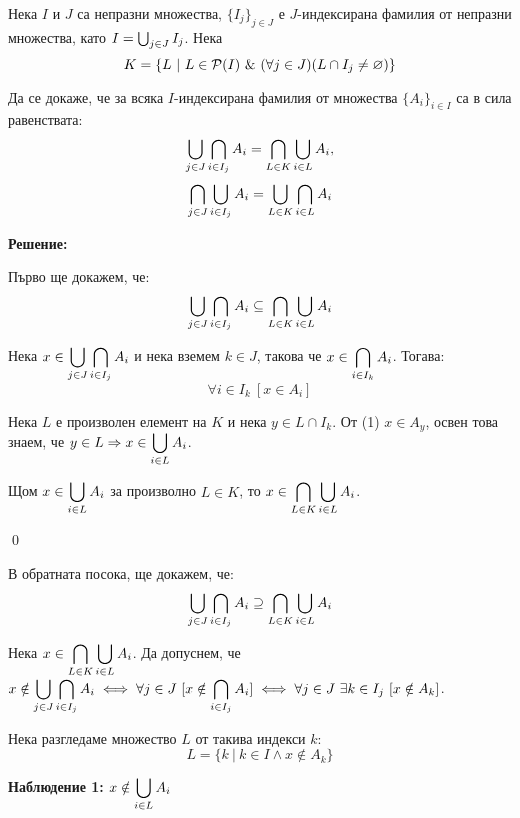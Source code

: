 \begin{problem}
Нека $I$ и $J$ са непразни множества, $\{I_j\}_{j \in J}$ е $J$-индексирана фамилия от непразни множества,
като $I = \bigcup_{j \in J} I_j$. Нека
\[
K = \{L\ |\ L \in \pow(I) \land (\forall j \in J) (L \cap I_j \neq \varnothing)\}
\]

Да се докаже, че за всяка $I$-индексирана фамилия от множества $\{A_i\}_{i \in I}$ са в сила равенствата:
\[
\bigcup_{j \in J} \bigcap_{i \in I_j} A_i = \bigcap_{L \in K} \bigcup_{i \in L} A_i,
\]
\[
\bigcap_{j \in J} \bigcup_{i \in I_j} A_i = \bigcup_{L \in K} \bigcap_{i \in L} A_i
\]

\textbf{Решение:}
\smallbreak

\quad
Първо ще докажем, че:
\[
\bigcup_{j \in J} \bigcap_{i \in I_j} A_i \subseteq \bigcap_{L \in K} \bigcup_{i \in L} A_i
\]

\begin{tcolorbox}[mybox={Доказателство:}]
Нека \(\displaystyle x \in \bigcup_{j \in J} \bigcap_{i \in I_j} A_i\) и нека
вземем $k \in J$, такова че $\displaystyle x \in \bigcap_{i \in I_k} A_i$. Тогава:
\begin{equation}
\forall i \in I_k\ [x \in A_i]
\end{equation}


Нека $L$ е произволен елемент на $K$ и нека $y \in L \cap I_k$.
От (1) $x \in A_y$, освен това знаем, че $\displaystyle y \in L \Rightarrow x \in \bigcup_{i \in L} A_i$.

Щом $\displaystyle x \in \bigcup_{i \in L} A_i$ за произволно $L \in K$,
то $\displaystyle x \in \bigcap_{L \in K} \bigcup_{i \in L} A_i$.

\qed
\end{tcolorbox}

\bigbreak
В обратната посока, ще докажем, че:
\[
\bigcup_{j \in J} \bigcap_{i \in I_j} A_i \supseteq \bigcap_{L \in K} \bigcup_{i \in L} A_i
\]
\begin{tcolorbox}[mybox={Доказателство:}]
Нека \(\displaystyle x \in \bigcap_{L \in K} \bigcup_{i \in L} A_i\).
Да допуснем, че
$\displaystyle x \notin \bigcup_{j \in J} \bigcap_{i \in I_j} A_i \iff
\forall j \in J\ [x \notin \bigcap_{i \in I_j} A_i] \iff
\forall j \in J\ \exists k \in I_j \ [x \notin A_k]$.

Нека разгледаме множество $L$ от такива индекси $k$:
\[
L = \{k \ |\ k \in I \land x \notin A_k\}
\]

\textbf{Наблюдение 1:} $\displaystyle x \notin \bigcup_{i \in L} A_i$


\end{tcolorbox}
\end{problem}
